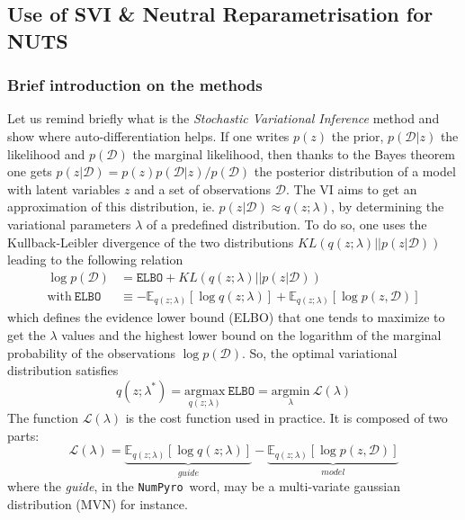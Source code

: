 \documentclass[final,5p,times,twocolumn,authoryear]{elsarticle}
\newcommand{\numpyro}{\texttt{NumPyro}}
\begin{document}
%
\subsection{Use of SVI \& Neutral Reparametrisation for NUTS}
\subsubsection{Brief introduction on the methods}
%
Let us remind briefly what is the \textit{Stochastic Variational Inference} method \citep{2012arXiv1206.7051H, 2017arXiv171105597Z} and show where auto-differentiation helps. If one  writes $p(z)$ the prior, $p(\mathcal{D}|z)$ the likelihood and $p(\mathcal{D})$ the marginal likelihood, then thanks to the  Bayes theorem one gets $p(z|\mathcal{D})=p(z)p(\mathcal{D}|z)/p(\mathcal{D})$ the posterior distribution of a model with latent variables $z$ and a set of observations $\mathcal{D}$. The VI aims to get an approximation of this distribution, ie. $p(z|\mathcal{D}) \approx q(z;\lambda)$, by determining the variational parameters $\lambda$ of a predefined distribution. To do so, one uses the Kullback-Leibler divergence of the two distributions $KL(q(z;\lambda)||p(z|\mathcal{D}))$ leading to the following relation
\begin{align}
\log p(\mathcal{D}) &= \mathtt{ELBO} +  KL(q(z;\lambda)||p(z|\mathcal{D})) \label{eq-ELBO} \\
\mathrm{with} \ \mathtt{ELBO} &\equiv -\mathbb{E}_{q(z;\lambda)}\left[ \log q(z;\lambda)\right] + \mathbb{E}_{q(z;\lambda)}\left[ \log p(z,\mathcal{D}) \right] 
\end{align}
which defines the evidence lower bound (ELBO) that one tends to maximize to get the $\lambda$ values and the  highest lower bound on the logarithm of the marginal probability of the observations $\log p(\mathcal{D})$. So, the optimal variational distribution satisfies
\begin{equation}
q(z;\lambda^\ast) = \underset{q(z;\lambda)}{\mathrm{argmax}}\  \mathtt{ELBO} = 
\underset{\lambda}{\mathrm{argmin}}\ \mathcal{L}(\lambda)
\end{equation}
The function $\mathcal{L}(\lambda)$ is the cost function used in practice. It is composed of two parts:
\begin{equation}
\mathcal{L}(\lambda) = \underbrace{\mathbb{E}_{q(z;\lambda)}\left[ \log q(z;\lambda)\right]}_{guide} - \underbrace{\mathbb{E}_{q(z;\lambda)}\left[ \log p(z,\mathcal{D}) \right]}_{model}
\label{eq-loss-svi-1}
\end{equation}
where the \textit{guide}, in the \numpyro\ word, may be a multi-variate gaussian distribution (MVN) for instance. 
\end{document}
